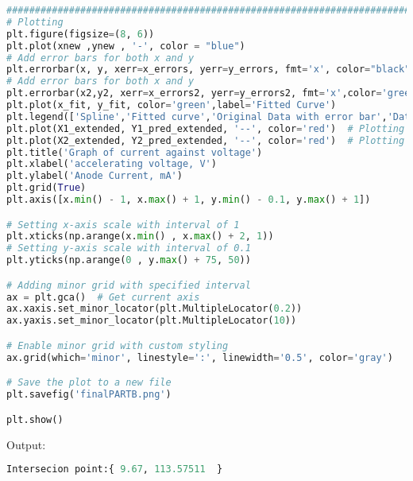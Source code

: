 \documentclass[a4paper,11pt]{article}
\begin{document}
\begin{lstlisting}[language=Python]
#############################################################################
# Plotting
plt.figure(figsize=(8, 6))
plt.plot(xnew ,ynew , '-', color = "blue")
# Add error bars for both x and y
plt.errorbar(x, y, xerr=x_errors, yerr=y_errors, fmt='x', color="black", ecolor='red', elinewidth=1, capsize=4, label='Original Data with Error Bars')
# Add error bars for both x and y
plt.errorbar(x2,y2, xerr=x_errors2, yerr=y_errors2, fmt='x',color='green',ecolor='orange',elinewidth=2, capsize=4)
plt.plot(x_fit, y_fit, color='green',label='Fitted Curve')
plt.legend(['Spline','Fitted curve','Original Data with error bar','Data of region of interest with error bar'], loc='upper left')
plt.plot(X1_extended, Y1_pred_extended, '--', color='red')  # Plotting the regression line 1
plt.plot(X2_extended, Y2_pred_extended, '--', color='red')  # Plotting the regression line 2
plt.title('Graph of current against voltage')
plt.xlabel('accelerating voltage, V')
plt.ylabel('Anode Current, mA')
plt.grid(True)
plt.axis([x.min() - 1, x.max() + 1, y.min() - 0.1, y.max() + 1])

# Setting x-axis scale with interval of 1
plt.xticks(np.arange(x.min() , x.max() + 2, 1))
# Setting y-axis scale with interval of 0.1
plt.yticks(np.arange(0 , y.max() + 75, 50))

# Adding minor grid with specified interval
ax = plt.gca()  # Get current axis
ax.xaxis.set_minor_locator(plt.MultipleLocator(0.2))
ax.yaxis.set_minor_locator(plt.MultipleLocator(10))

# Enable minor grid with custom styling
ax.grid(which='minor', linestyle=':', linewidth='0.5', color='gray')

# Save the plot to a new file
plt.savefig('finalPARTB.png')

plt.show()
\end{lstlisting}
Output:
\begin{lstlisting}[language=Python]
Intersecion point:{ 9.67, 113.57511  }
\end{lstlisting}
\newpage
\end{document}
